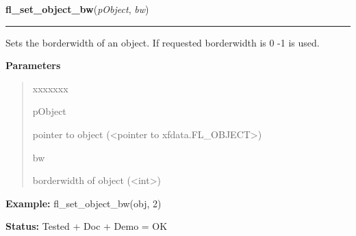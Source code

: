 \hspace{.8\funcindent}\begin{boxedminipage}{\funcwidth}

    \raggedright \textbf{fl\_set\_object\_bw}(\textit{pObject}, \textit{bw})

    \vspace{-1.5ex}

    \rule{\textwidth}{0.5\fboxrule}
\setlength{\parskip}{2ex}
    Sets the borderwidth of an object. If requested borderwidth is 0 -1 is 
    used.

\setlength{\parskip}{1ex}
      \textbf{Parameters}
      \vspace{-1ex}

      \begin{quote}
        \begin{Ventry}{xxxxxxx}

          \item[pObject]

          pointer to object ({\textless}pointer to 
          xfdata.FL\_OBJECT{\textgreater})

          \item[bw]

          borderwidth of object ({\textless}int{\textgreater})

        \end{Ventry}

      \end{quote}

\textbf{Example:} fl\_set\_object\_bw(obj, 2)



\textbf{Status:} Tested + Doc + Demo = OK



    \end{boxedminipage}

    \label{xformslib:library:fl_get_object_bw}

    \vspace{0.5ex}

